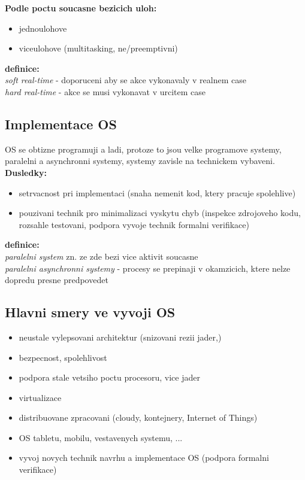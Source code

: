 \documentclass[a4paper, 11pt]{article}
\begin{document}
\noindent\textbf{Podle poctu soucasne bezicich uloh:}
\begin{itemize}
    \item jednoulohove
    \item viceulohove (multitasking, ne/preemptivni) \\
\end{itemize}

\noindent\textbf{definice:} \\[0.5em]
\textit{soft real-time} - doporuceni aby se akce vykonavaly v realnem case \\[0.2em]
\textit{hard real-time} - akce se musi vykonavat v urcitem case \\[1em]

\subsection{Implementace OS}

OS se obtizne programuji a ladi, protoze to jsou velke programove systemy, paralelni a asynchronni systemy, systemy zavisle na technickem vybaveni. \\

\noindent\textbf{Dusledky:}
\begin{itemize}
    \item setrvacnost pri implementaci (snaha nemenit kod, ktery pracuje spolehlive)
    \item pouzivani technik pro minimalizaci vyskytu chyb (inspekce zdrojoveho kodu, rozsahle testovani, podpora vyvoje technik formalni verifikace) \\
\end{itemize}

\noindent\textbf{definice:} \\[0.5em]
\textit{paralelni system} zn. ze zde bezi vice aktivit soucasne \\[0.2em]
\textit{paralelni asynchronni systemy} - procesy se prepinaji v okamzicich, ktere nelze dopredu presne predpovedet \\[1em]

\newpage

\subsection{Hlavni smery ve vyvoji OS}
\begin{itemize}
    \item neustale vylepsovani architektur (snizovani rezii jader,)
    \item bezpecnost, spolehlivost
    \item podpora stale vetsiho poctu procesoru, vice jader
    \item virtualizace
    \item distribuovane zpracovani (cloudy, kontejnery, Internet of Things)
    \item OS tabletu, mobilu, vestavenych systemu, ...
    \item vyvoj novych technik navrhu a implementace OS (podpora formalni verifikace) \\
\end{itemize}
\end{document}
